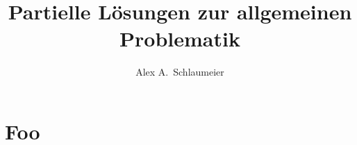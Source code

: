 \documentclass[master,german,smartquotes]{hgbthesis}
\title{Partielle Lösungen zur allgemeinen Problematik}
\author{Alex A.\ Schlaumeier}
\begin{document}

\frontmatter                    %

\maketitle
\tableofcontents

%

		
			

\mainmatter          %










\appendix                                            %





\backmatter

\chapter{Foo}
\end{document}
